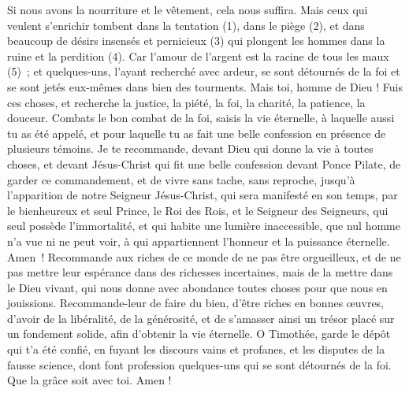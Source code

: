 \begin{multicols}{2}
Si nous avons la nourriture et le vêtement, cela nous suffira.
Mais ceux qui veulent s’enrichir tombent dans la tentation (1), dans le piège (2), et dans beaucoup de désirs insensés et pernicieux (3) qui plongent les hommes dans la ruine et la perdition (4).
Car l’amour de l’argent est la racine de tous les maux (5) ; et quelques-uns, l’ayant recherché avec ardeur, se sont détournés de la foi et se sont jetés eux-mêmes dans bien des tourments.
Mais toi, homme de Dieu ! Fuis ces choses, et recherche la justice, la piété, la foi, la charité, la patience, la douceur.
Combats le bon combat de la foi, saisis la vie éternelle, à laquelle aussi tu as été appelé, et pour laquelle tu as fait une belle confession en présence de plusieurs témoins.
Je te recommande, devant Dieu qui donne la vie à toutes choses, et devant Jésus-Christ qui fit une belle confession devant Ponce Pilate,
de garder ce commandement, et de vivre sans tache, sans reproche, jusqu’à l'apparition de notre Seigneur Jésus-Christ,
qui sera manifesté en son temps, par le bienheureux et seul Prince, le Roi des Rois, et le Seigneur des Seigneurs,
qui seul possède l'immortalité, et qui habite une lumière inaccessible, que nul homme n'a vue ni ne peut voir, à qui appartiennent l'honneur et la puissance éternelle. Amen !
Recommande aux riches de ce monde de ne pas être orgueilleux, et de ne pas mettre leur espérance dans des richesses incertaines, mais de la mettre dans le Dieu vivant, qui nous donne avec abondance toutes choses pour que nous en jouissions.
Recommande-leur de faire du bien, d’être riches en bonnes œuvres, d’avoir de la libéralité, de la générosité,
et de s’amasser ainsi un trésor placé sur un fondement solide, afin d’obtenir la vie éternelle.
O Timothée, garde le dépôt qui t’a été confié, en fuyant les discours vains et profanes, et les disputes de la fausse science,
dont font profession quelques-uns qui se sont détournés de la foi. Que la grâce soit avec toi. Amen !
\PPE{}
\end{multicols}